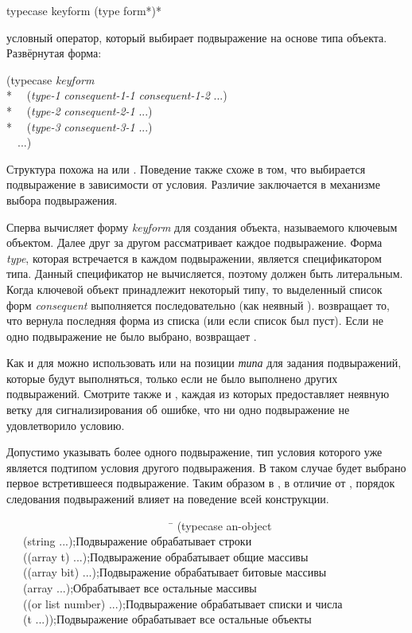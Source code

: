 \begin{defmac}
typecase keyform {(type {form}*)}*

 условный оператор, который выбирает подвыражение на основе типа
объекта.
Развёрнутая форма:
\begin{lisp}
(typecase \emph{keyform} \\*
~~(\emph{type-1} \emph{consequent-1-1} \emph{consequent-1-2} ...) \\*
~~(\emph{type-2} \emph{consequent-2-1} ...) \\*
~~(\emph{type-3} \emph{consequent-3-1} ...) \\
~~...)
\end{lisp}
Структура  похожа на  или . Поведение также
схоже в том, что выбирается подвыражение в зависимости от условия.
Различие заключается в механизме выбора подвыражения.

Сперва  вычисляет форму \emph{keyform} для создания объекта,
называемого ключевым объектом.
Далее  друг за другом рассматривает каждое подвыражение. Форма
\emph{type}, которая встречается в каждом подвыражении, является спецификатором
типа. Данный спецификатор не вычисляется, поэтому должен быть литеральным.
Когда ключевой объект принадлежит некоторый типу, то выделенный список форм
\emph{consequent} выполняется последовательно (как неявный
).  возвращает то, что вернула последняя форма из
списка (или {\false} если список был пуст).
Если не одно подвыражение не было выбрано,  возвращает {\false}.

Как и для  можно использовать {\true} или  на позиции
\emph{типа} для задания подвыражений, которые будут выполняться, только если не
было выполнено других подвыражений.
Смотрите также  и , каждая из которых
предоставляет неявную ветку  для сигнализирования об ошибке, что
ни одно подвыражение не удовлетворило условию.

Допустимо указывать более одного подвыражение, тип условия которого уже является
подтипом условия другого подвыражения. В таком случае будет выбрано первое
встретившееся подвыражение. Таким образом в , в отличие от
, порядок следования подвыражений влияет на поведение всей
конструкции.
\begin{lisp}
~~~~~~~~~~~~~~~~~~~~~~~~~~~~~~\=\kill
(typecase an-object \\
~~~(string ...)\>;\textrm{Подвыражение обрабатывает строки} \\
~~~((array t) ...)\>;\textrm{Подвыражение обрабатывает общие массивы} \\
~~~((array bit) ...)\>;\textrm{Подвыражение обрабатывает битовые массивы} \\
~~~(array ...)\>;\textrm{Обрабатывает все остальные массивы} \\
~~~((or list number) ...)\>;\textrm{Подвыражение обрабатывает списки и числа} \\
~~~(t ...))\>;\textrm{Подвыражение обрабатывает все остальные объекты}
\end{lisp}
\end{defmac}

